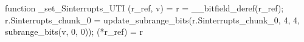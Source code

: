 function _set_Sinterrupts_UTI (r_ref, v) = {
    r = __bitfield_deref(r_ref);
    r.Sinterrupts_chunk_0 = update_subrange_bits(r.Sinterrupts_chunk_0, 4, 4, subrange_bits(v, 0, 0));
    (*r_ref) = r
}

